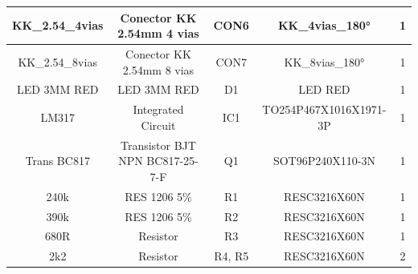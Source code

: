 \documentclass[../poliXuniversity_hospital_-USP-report.tex]{subfiles}
\begin{document}
\begin{table}[]
\begin{adjustbox}{width=\columnwidth,center}
\begin{tabular}{|c|c|c|c|c|}
KK\_2.54\_4vias      & Conector KK 2.54mm 4   vias                                    & CON6                                                                                                                     & KK\_4vias\_180°        & 1        \\ \hline
KK\_2.54\_8vias      & Conector KK 2.54mm 8   vias                                    & CON7                                                                                                                     & KK\_8vias\_180°        & 1        \\ \hline
LED 3MM RED          & LED 3MM RED                                                    & D1                                                                                                                       & LED RED                & 1        \\ \hline
LM317                & Integrated Circuit                                             & IC1                                                                                                                      & TO254P467X1016X1971-3P & 1        \\ \hline
Trans BC817          & Transistor BJT NPN   BC817-25-7-F                              & Q1                                                                                                                       & SOT96P240X110-3N       & 1        \\ \hline
240k                 & RES 1206 5\%                                                   & R1                                                                                                                       & RESC3216X60N           & 1        \\ \hline
390k                 & RES 1206 5\%                                                   & R2                                                                                                                       & RESC3216X60N           & 1        \\ \hline
680R                 & Resistor                                                       & R3                                                                                                                       & RESC3216X60N           & 1        \\ \hline
2k2                  & Resistor                                                       & R4, R5                                                                                                                   & RESC3216X60N           & 2        \\ \hline

\end{tabular}
\end{adjustbox}
\end{table}
\end{document}
